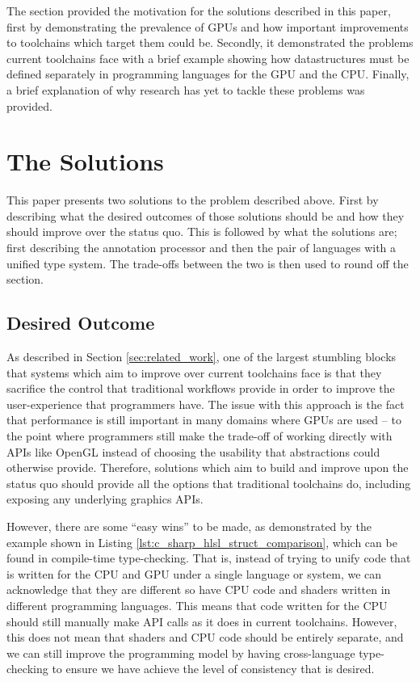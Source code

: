 \documentclass[a4paper,12pt,twoside,openright]{report}
\begin{document}
The section provided the motivation for the solutions described in this paper,
first by demonstrating the prevalence of GPUs and how important improvements to
toolchains which target them could be. Secondly, it demonstrated the problems
current toolchains face with a brief example showing how datastructures must be
defined separately in programming languages for the GPU and the CPU. Finally, a
brief explanation of why research has yet to tackle these problems was
provided.

\section{The Solutions}

This paper presents two solutions to the problem described above. First by
describing what the desired outcomes of those solutions should be and how they
should improve over the status quo. This is followed by what the solutions are;
first describing the annotation processor and then the pair of languages with a
unified type system. The trade-offs between the two is then used to round off
the section.

\subsection{Desired Outcome}

As described in Section \ref{sec:related_work}, one of the largest stumbling
blocks that systems which aim to improve over current toolchains face is that
they sacrifice the control that traditional workflows provide in order to
improve the user-experience that programmers have. The issue with this approach
is the fact that performance is still important in many domains where GPUs are
used -- to the point where programmers still make the trade-off of working
directly with APIs like OpenGL instead of choosing the usability that
abstractions could otherwise provide. Therefore, solutions which aim to build
and improve upon the status quo should provide all the options that traditional
toolchains do, including exposing any underlying graphics APIs.

However, there are some ``easy wins'' to be made, as demonstrated by the
example shown in Listing \ref{lst:c_sharp_hlsl_struct_comparison}, which can be
found in compile-time type-checking. That is, instead of trying to unify code
that is written for the CPU and GPU under a single language or system, we can
acknowledge that they are different so have CPU code and shaders written in
different programming languages. This means that code written for the CPU
should still manually make API calls as it does in current toolchains. However,
this does not mean that shaders and CPU code should be entirely separate, and
we can still improve the programming model by having cross-language
type-checking to ensure we have achieve the level of consistency that is
desired.
\end{document}
